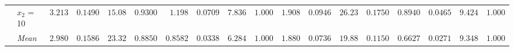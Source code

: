 \begin{table}[htbp]
\begin{tabular}{llrrrrrrrrrrrrrrrr}
 & $x_2$ = 10 & $3.213$ & $0.1490$ & $15.08$ & {\boldmath$0.9300$} & $1.198$ & $0.0709$ & {\boldmath$7.836$} & $1.000$ & $1.908$ & $0.0946$ & $26.23$ & $0.1750$ & {\boldmath$0.8940$} & {\boldmath$0.0465$} & $9.424$ & $1.000$ \\
 & \textit{Mean} & $2.980$ & $0.1586$ & $23.32$ & \colorbox{green!20}{\boldmath$0.8850$} & $0.8582$ & $0.0338$ & \colorbox{green!20}{\boldmath$6.284$} & $1.000$ & $1.880$ & $0.0736$ & $19.88$ & $0.1150$ & \colorbox{green!20}{\boldmath$0.6627$} & \colorbox{green!20}{\boldmath$0.0271$} & $9.348$ & $1.000$ \\
\bottomrule
\end{tabular}
\end{table}
